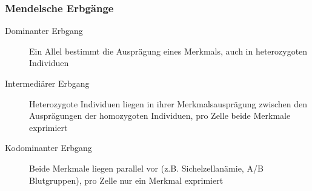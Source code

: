 \subsubsection{Mendelsche Erbgänge}
\begin{description}
    \item[Dominanter Erbgang] Ein Allel bestimmt die Ausprägung eines Merkmals, auch in heterozygoten Individuen
    \item[Intermediärer Erbgang] Heterozygote Individuen liegen in ihrer Merkmalsausprägung zwischen den Ausprägungen der homozygoten Individuen, pro Zelle beide Merkmale exprimiert
    \item[Kodominanter Erbgang] Beide Merkmale liegen parallel vor (z.B. Sichelzellanämie, A/B Blutgruppen), pro Zelle nur ein Merkmal exprimiert
\end{description}

